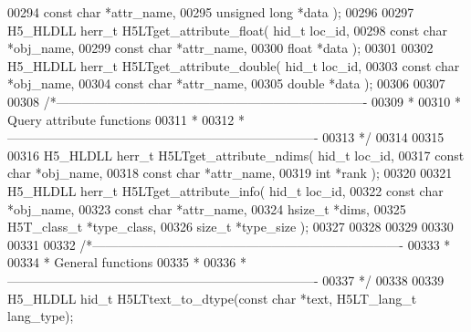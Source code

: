 \begin{DoxyCode}
00294                                \textcolor{keyword}{const} \textcolor{keywordtype}{char} *attr\_name,
00295                                \textcolor{keywordtype}{unsigned} \textcolor{keywordtype}{long} *data );
00296 
00297 H5\_HLDLL herr\_t  H5LTget\_attribute\_float( hid\_t loc\_id,
00298                                 \textcolor{keyword}{const} \textcolor{keywordtype}{char} *obj\_name,
00299                                 \textcolor{keyword}{const} \textcolor{keywordtype}{char} *attr\_name,
00300                                 \textcolor{keywordtype}{float} *data );
00301 
00302 H5\_HLDLL herr\_t  H5LTget\_attribute\_double( hid\_t loc\_id,
00303                                  \textcolor{keyword}{const} \textcolor{keywordtype}{char} *obj\_name,
00304                                  \textcolor{keyword}{const} \textcolor{keywordtype}{char} *attr\_name,
00305                                  \textcolor{keywordtype}{double} *data );
00306 
00307 
00308 \textcolor{comment}{/*-------------------------------------------------------------------------}
00309 \textcolor{comment}{ *}
00310 \textcolor{comment}{ * Query attribute functions}
00311 \textcolor{comment}{ *}
00312 \textcolor{comment}{ *-------------------------------------------------------------------------}
00313 \textcolor{comment}{ */}
00314 
00315 
00316 H5\_HLDLL herr\_t  H5LTget\_attribute\_ndims( hid\_t loc\_id,
00317                                 \textcolor{keyword}{const} \textcolor{keywordtype}{char} *obj\_name,
00318                                 \textcolor{keyword}{const} \textcolor{keywordtype}{char} *attr\_name,
00319                                 \textcolor{keywordtype}{int} *rank );
00320 
00321 H5\_HLDLL herr\_t  H5LTget\_attribute\_info( hid\_t loc\_id,
00322                                \textcolor{keyword}{const} \textcolor{keywordtype}{char} *obj\_name,
00323                                \textcolor{keyword}{const} \textcolor{keywordtype}{char} *attr\_name,
00324                                hsize\_t *dims,
00325                                H5T\_class\_t *type\_class,
00326                                \textcolor{keywordtype}{size\_t} *type\_size );
00327 
00328 
00329 
00330 
00331 
00332 \textcolor{comment}{/*-------------------------------------------------------------------------}
00333 \textcolor{comment}{ *}
00334 \textcolor{comment}{ * General functions}
00335 \textcolor{comment}{ *}
00336 \textcolor{comment}{ *-------------------------------------------------------------------------}
00337 \textcolor{comment}{ */}
00338 
00339 H5\_HLDLL hid\_t H5LTtext\_to\_dtype(\textcolor{keyword}{const} \textcolor{keywordtype}{char} *text, H5LT\_lang\_t lang\_type);

\end{DoxyCode}
